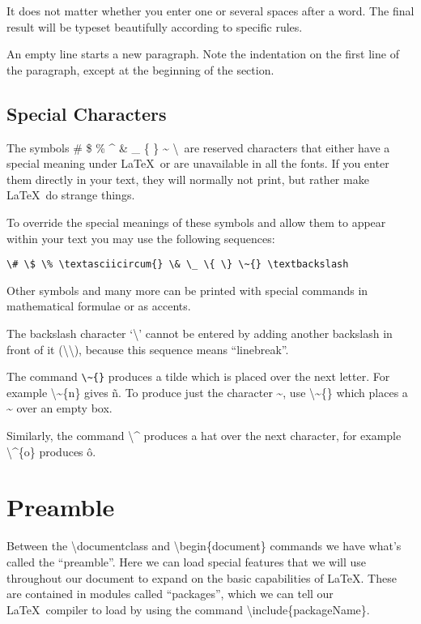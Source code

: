 \vspace*{2ex}

It does not matter whether you
enter one or several             spaces
after a word. The final result will be typeset beautifully
according    to     specific rules.




An empty line starts a new
paragraph. Note the indentation on the first line of the paragraph, except at the beginning of the section.

\pagebreak
\subsection{Special Characters}
The symbols \# \$ \% \textasciicircum{} \& \_ \{ \} \~{} \textbackslash\ are reserved characters that either have a special meaning under \LaTeX\ or are unavailable in all the fonts. If you enter them directly in your text, they will normally not print, but rather make \LaTeX\ do strange things.

To override the special meanings of these symbols and allow them to appear within your text you may use the following sequences:
\begin{verbatim}
\# \$ \% \textasciicircum{} \& \_ \{ \} \~{} \textbackslash
\end{verbatim}
Other symbols and many more can be printed with special commands in mathematical formulae or as accents.

The backslash character `\textbackslash' cannot be entered by adding another backslash in front of it (\textbackslash\textbackslash), because this sequence means ``linebreak''.

The command {\tt \textbackslash\~{}\{\}} produces a tilde which is placed over the next letter. For example \textbackslash\~{}\{n\} gives \~{n}. To produce just the character \~{}, use \textbackslash\~{}\{\} which places a \~{} over an empty box.

Similarly, the command \textbackslash\textasciicircum{} produces a hat over the next character, for example \textbackslash\textasciicircum\{o\} produces \^{o}.

\pagebreak
\section{Preamble}
Between the {\textbackslash}documentclass and {\textbackslash}begin\{document\} commands we have what's called the ``preamble''. Here we can load special features that we will use throughout our document to expand on the basic capabilities of \LaTeX. These are contained in modules called ``packages'', which we can tell our \LaTeX\ compiler to load by using the command {\textbackslash}include\{packageName\}.

